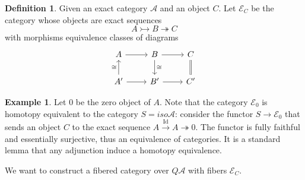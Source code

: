 \documentclass{article}
\theoremstyle{definition}
\theoremstyle{definition}
\newtheorem{definition}{Definition}[theorem]
\theoremstyle{definition}
\theoremstyle{definition}
\theoremstyle{definition}
\theoremstyle{definition}
\theoremstyle{definition}
\newtheorem{example}{Example}[theorem]
\begin{document}
\begin{tcolorbox}[colback=purple!5!white,colframe=purple!75!black]
\begin{definition}
Given an exact category $\mathcal{A}$ and an object $C$. Let $\mathcal{E}_C$ be the category whose objects are exact sequences 
\[A\rightarrowtail B\twoheadrightarrow C\]
with morphisms equivalence classes of diagrams 
\[\begin{tikzcd}
	A & B & C \\
	{A'} & {B'} & {C'}
	\arrow[from=1-1, to=1-2]
	\arrow["\cong", from=2-1, to=1-1]
	\arrow[from=1-2, to=1-3]
	\arrow["{\cong }", from=1-2, to=2-2]
	\arrow[equal, from=1-3, to=2-3]
	\arrow[from=2-1, to=2-2]
	\arrow[from=2-2, to=2-3]
\end{tikzcd}\]
\end{definition}
\end{tcolorbox}

\begin{tcolorbox}[colback=yellow!5!white,colframe=yellow!30!white]
\begin{example}
Let $0$ be the zero object of $A$. Note that the category $\mathcal{E}_0$ is homotopy equivalent to the category $S=iso \mathcal{A}$: consider the functor $S\to \mathcal{E}_0$ that sends an object $C$ to the exact sequence $A\xrightarrow{\textrm{Id}}A\twoheadrightarrow 0$. The functor is fully faithful and essentially surjective, thus an equivalence of categories. It is a standard lemma that any adjunction induce a homotopy equivalence. 
\end{example}
\end{tcolorbox}
We want to construct a fibered category over $Q \mathcal{A}$ with fibers $\mathcal{E}_C$. 
\end{document}
